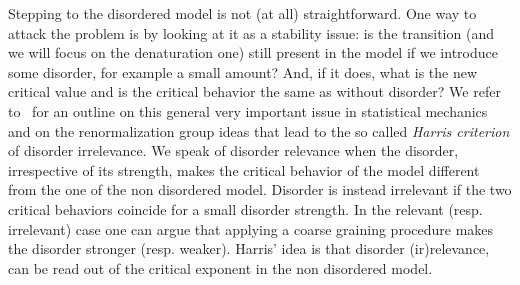 Stepping to the disordered model is not (at all) straightforward. One way to attack the problem is by looking at it as a stability issue: is the transition (and we will focus on the denaturation one) still present in the model if we introduce some disorder, for example a small amount? And, if it does, what is the new critical value and is the critical behavior the same as without disorder? We refer to~\cite[Chapter~5]{cf:GB} for an outline on this general very important issue in statistical mechanics and on the renormalization group ideas that lead to the so called \emph{Harris criterion} of disorder irrelevance. We speak of disorder relevance when the disorder, irrespective of its strength, makes the critical behavior of the model different from the one of the non disordered model. Disorder is instead irrelevant if the two critical behaviors coincide for a small disorder strength. In the relevant (resp. irrelevant) case one can argue that applying a coarse graining procedure makes the disorder stronger (resp. weaker). Harris' idea is that disorder (ir)relevance, can be read out of the critical exponent in the non disordered model.

